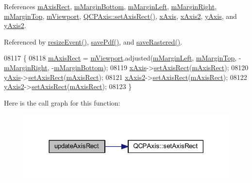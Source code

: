 References \hyperlink{a00116_source_l02111}{m\+Axis\+Rect}, \hyperlink{a00116_source_l02112}{m\+Margin\+Bottom}, \hyperlink{a00116_source_l02112}{m\+Margin\+Left}, \hyperlink{a00116_source_l02112}{m\+Margin\+Right}, \hyperlink{a00116_source_l02112}{m\+Margin\+Top}, \hyperlink{a00116_source_l02110}{m\+Viewport}, \hyperlink{a00115_source_l03635}{Q\+C\+P\+Axis\+::set\+Axis\+Rect()}, \hyperlink{a00116_source_l02076}{x\+Axis}, \hyperlink{a00116_source_l02076}{x\+Axis2}, \hyperlink{a00116_source_l02076}{y\+Axis}, and \hyperlink{a00116_source_l02076}{y\+Axis2}.



Referenced by \hyperlink{a00115_source_l07525}{resize\+Event()}, \hyperlink{a00115_source_l07350}{save\+Pdf()}, and \hyperlink{a00115_source_l08146}{save\+Rastered()}.


\begin{DoxyCode}
08117 \{
08118   \hyperlink{a00116_aad382d311cfe6a81f47aa4ae3350021b}{mAxisRect} = \hyperlink{a00116_a69feeea9d5254eab8ba7f9be13f85e0b}{mViewport}.adjusted(\hyperlink{a00116_a011307bfbe2ac7e60f13d2fa45e31113}{mMarginLeft}, 
      \hyperlink{a00116_a746a9e31a0cf3ce3be1bbd3a6fa2c8be}{mMarginTop}, -\hyperlink{a00116_af5efe5736378d5f8061fd6bf5dc92a2d}{mMarginRight}, -\hyperlink{a00116_ad02e2d81ae66d4261d1e46a6979ea118}{mMarginBottom});
08119   \hyperlink{a00116_a384438707adbcc96b0fa1324106f7129}{xAxis}->\hyperlink{a00025_a0188c6248366fc9f9ff816dceee986e0}{setAxisRect}(\hyperlink{a00116_aad382d311cfe6a81f47aa4ae3350021b}{mAxisRect});
08120   \hyperlink{a00116_af168096ce67002b1fbce18ae5dd1b652}{yAxis}->\hyperlink{a00025_a0188c6248366fc9f9ff816dceee986e0}{setAxisRect}(\hyperlink{a00116_aad382d311cfe6a81f47aa4ae3350021b}{mAxisRect});
08121   \hyperlink{a00116_a058f6d3a4c86bf94c476e5c380711dba}{xAxis2}->\hyperlink{a00025_a0188c6248366fc9f9ff816dceee986e0}{setAxisRect}(\hyperlink{a00116_aad382d311cfe6a81f47aa4ae3350021b}{mAxisRect});
08122   \hyperlink{a00116_a4fd6679232da7da0a1ae4e1b6ae83d6e}{yAxis2}->\hyperlink{a00025_a0188c6248366fc9f9ff816dceee986e0}{setAxisRect}(\hyperlink{a00116_aad382d311cfe6a81f47aa4ae3350021b}{mAxisRect});
08123 \}
\end{DoxyCode}


Here is the call graph for this function\+:
\nopagebreak
\begin{figure}[H]
\begin{center}
\leavevmode
\includegraphics[width=318pt]{d4/d3e/a00116_a428242419d3a1b63f2cbff637986c35c_cgraph}
\end{center}
\end{figure}





